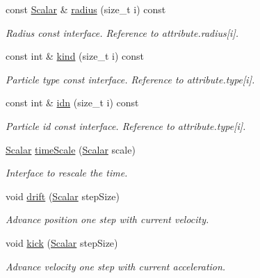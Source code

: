 \begin{DoxyCompactItemize}
const \mbox{\hyperlink{classparticle_system_a3938954186247e3eab01cc75fcc62b40}{Scalar}} \& \mbox{\hyperlink{classparticle_system_a1986f65f13b773a51b19eba1ccd6c46a}{radius}} (size\+\_\+t i) const
\begin{DoxyCompactList}\small\item\em Radius const interface. Reference to attribute.\+radius\mbox{[}i\mbox{]}. \end{DoxyCompactList}\item 
const int \& \mbox{\hyperlink{classparticle_system_ad406c7bb71f92b27d918b0b36c0f9e93}{kind}} (size\+\_\+t i) const
\begin{DoxyCompactList}\small\item\em Particle type const interface. Reference to attribute.\+type\mbox{[}i\mbox{]}. \end{DoxyCompactList}\item 
const int \& \mbox{\hyperlink{classparticle_system_a1d809808c2eaeeaa2e58b8fcf0aa5789}{idn}} (size\+\_\+t i) const
\begin{DoxyCompactList}\small\item\em Particle id const interface. Reference to attribute.\+type\mbox{[}i\mbox{]}. \end{DoxyCompactList}\item 
\mbox{\hyperlink{classparticle_system_a3938954186247e3eab01cc75fcc62b40}{Scalar}} \mbox{\hyperlink{classparticle_system_a803227b33f7c25f28fb0575cf798d1a8}{time\+Scale}} (\mbox{\hyperlink{classparticle_system_a3938954186247e3eab01cc75fcc62b40}{Scalar}} scale)
\begin{DoxyCompactList}\small\item\em Interface to rescale the time. \end{DoxyCompactList}\item 
void \mbox{\hyperlink{classparticle_system_a3f88bac7a0941910cbffe4ec6b1f32ec}{drift}} (\mbox{\hyperlink{classparticle_system_a3938954186247e3eab01cc75fcc62b40}{Scalar}} step\+Size)
\begin{DoxyCompactList}\small\item\em Advance position one step with current velocity. \end{DoxyCompactList}\item 
void \mbox{\hyperlink{classparticle_system_abda10b9f9dc5ea55a2d9fdf7f9d76d8d}{kick}} (\mbox{\hyperlink{classparticle_system_a3938954186247e3eab01cc75fcc62b40}{Scalar}} step\+Size)
\begin{DoxyCompactList}\small\item\em Advance velocity one step with current acceleration. \end{DoxyCompactList}\item 

\end{DoxyCompactItemize}
